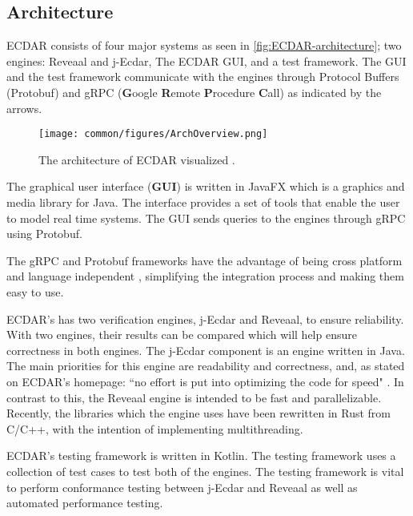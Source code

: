 \subsection{Architecture}\label{sub:architecture}
ECDAR consists of four major systems as seen in \autoref{fig:ECDAR-architecture};
two engines: Reveaal and j-Ecdar, The ECDAR GUI, and a test framework.
The GUI and the test framework communicate with the engines through Protocol Buffers (Protobuf) and gRPC (\textbf{G}oogle \textbf{R}emote \textbf{P}rocedure \textbf{C}all) as indicated by the arrows.
\begin{figure}[H]
    \centering
    \texttt{[image: common/figures/ArchOverview.png]}
    \caption{The architecture of ECDAR visualized \cite{ECDARNET}.}
    \label{fig:ECDAR-architecture}
\end{figure}

The graphical user interface (\textbf{GUI}) is written in JavaFX \cite{ECDARNET}  which is a graphics and media library for Java. 
The interface provides a set of tools that enable the user to model real time systems. 
The GUI sends queries to the engines through gRPC using Protobuf. 

The gRPC and Protobuf frameworks have the advantage of being cross platform and language independent \cite{gRPC}\cite{google_protocol_nodate}, simplifying the integration process and making them easy to use.

ECDAR's has two verification engines, j-Ecdar and Reveaal, to ensure reliability. 
With two engines, their results can be compared which will help ensure correctness in both engines.
The j-Ecdar component is an engine written in Java.
The main priorities for this engine are readability and correctness, and, as stated on ECDAR's homepage: ``no effort is put into optimizing the code for speed" \cite{ECDARNET}.
In contrast to this, the Reveaal engine is intended to be fast and parallelizable. 
Recently, the libraries which the engine uses have been rewritten in Rust from C/C++, with the intention of implementing multithreading. 

ECDAR's testing framework is written in Kotlin. 
The testing framework uses a collection of test cases to test both of the engines. 
The testing framework is vital to perform conformance testing between j-Ecdar and Reveaal as well as automated performance testing. 